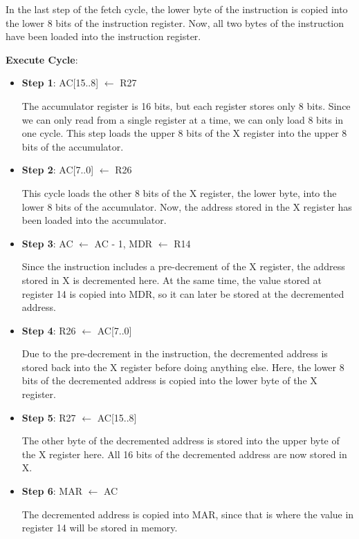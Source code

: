 \documentclass[11pt]{article}
\begin{document}
\begin{enumerate}[leftmargin=0.2in]
\begin{itemize}
    In the last step of the fetch cycle, the lower byte of the instruction is copied into the lower 8 bits of the instruction register. Now, all two bytes of the instruction have been loaded into the instruction register.
\end{itemize}

\textbf{Execute Cycle}:
\begin{itemize}
  \item \textbf{Step 1}: AC[15..8] $\leftarrow$ R27

    The accumulator register is 16 bits, but each register stores only 8 bits. Since we can only read from a single register at a time, we can only load 8 bits in one cycle. This step loads the upper 8 bits of the X register into the upper 8 bits of the accumulator.

  \item \textbf{Step 2}: AC[7..0] $\leftarrow$ R26

    This cycle loads the other 8 bits of the X register, the lower byte, into the lower 8 bits of the accumulator. Now, the address stored in the X register has been loaded into the accumulator.

  \item \textbf{Step 3}: AC $\leftarrow$ AC - 1, MDR $\leftarrow$ R14

    Since the instruction includes a pre-decrement of the X register, the address stored in X is decremented here. At the same time, the value stored at register 14 is copied into MDR, so it can later be stored at the decremented address.

  \item \textbf{Step 4}: R26 $\leftarrow$ AC[7..0]

    Due to the pre-decrement in the instruction, the decremented address is stored back into the X register before doing anything else. Here, the lower 8 bits of the decremented address is copied into the lower byte of the X register.

  \item \textbf{Step 5}: R27 $\leftarrow$ AC[15..8]

    The other byte of the decremented address is stored into the upper byte of the X register here. All 16 bits of the decremented address are now stored in X.

  \item \textbf{Step 6}: MAR $\leftarrow$ AC

    The decremented address is copied into MAR, since that is where the value in register 14 will be stored in memory.


\end{itemize}
\end{enumerate}
\end{document}
